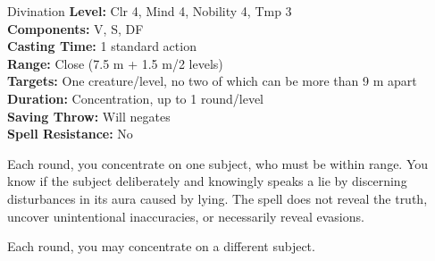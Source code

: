 {Divination}
{
	\textbf{Level:}
	Clr 4, Mind 4, Nobility 4, Tmp 3\\
	\textbf{Components:}
	V, S, DF\\
	\textbf{Casting Time:}
	1 standard action\\
	\textbf{Range:}
	Close (7.5 m + 1.5 m/2 levels)\\
	\textbf{Targets:}
	One creature/level, no two of which can be more than 9 m apart\\
	\textbf{Duration:}
	Concentration, up to 1 round/level\\
	\textbf{Saving Throw:}
	Will negates\\
	\textbf{Spell Resistance:}
	No\\
}
{
	Each round, you concentrate on one subject, who must be within range. You know if the subject deliberately and knowingly speaks a lie by discerning disturbances in its aura caused by lying. The spell does not reveal the truth, uncover unintentional inaccuracies, or necessarily reveal evasions.

	Each round, you may concentrate on a different subject.

}
